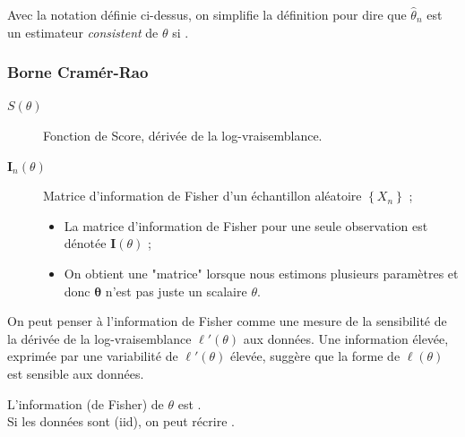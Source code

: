 \documentclass[10pt, french]{article}
\begin{document}
\begin{multicols*}{2}
\begin{definitionNOHFILL}
Avec la notation définie ci-dessus, on simplifie la définition pour dire que $\hat{\theta}_{n}$ est un estimateur \og \textit{consistent} \fg{} de $\theta$ si .
\end{definitionNOHFILL}



\columnbreak	
\subsubsection{Borne Cramér-Rao} \label{sec:cramer_rao}
\begin{distributions}[Notation]
\begin{description}
	\item[$S(\theta)$]	Fonction de Score, dérivée de la log-vraisemblance.
	\item[$\bm{I}_{n}(\theta)$]	Matrice d'information de Fisher d'un échantillon aléatoire $\left\{X_{n}\right\}$ ;
		\begin{itemize}
		\item	La matrice d'information de Fisher pour une seule observation est dénotée $\bm{I}(\theta)$ ;
		\item	On obtient une "matrice" lorsque nous estimons plusieurs paramètres et donc $\bm{\theta}$ n'est pas juste un scalaire $\theta$.
		\end{itemize}
\end{description}
\end{distributions}

\begin{definitionNOHFILL}
\begin{rappel_enhanced}[Contexte]
On peut penser à l'information de Fisher comme une mesure de la sensibilité de la dérivée de la log-vraisemblance $\ell'(\theta)$ aux données. Une information élevée, exprimée par une variabilité de $\ell'(\theta)$ élevée, suggère que la forme de $\ell(\theta)$ est sensible aux données.
\end{rappel_enhanced}

L'information (de Fisher) de $\theta$ est . \\

Si les données sont (iid), on peut récrire .


\end{definitionNOHFILL}
\end{multicols*}
\end{document}
